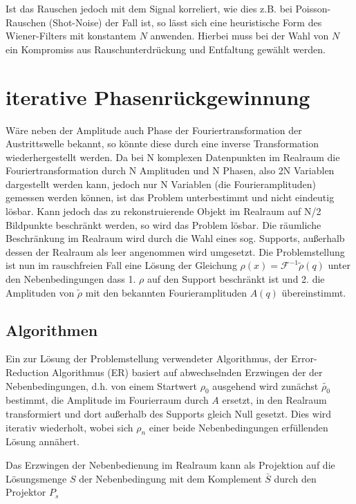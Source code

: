 Ist das Rauschen jedoch mit dem Signal korreliert, wie dies z.B. bei Poisson-Rauschen (Shot-Noise) der Fall ist, so lässt sich eine heuristische Form des Wiener-Filters mit konstantem $N$ anwenden. Hierbei muss bei der Wahl von $N$ ein Kompromiss aus Rauschunterdrückung und Entfaltung gewählt werden.

\section{iterative Phasenrückgewinnung}
Wäre neben der Amplitude auch Phase der Fouriertransformation der Austrittswelle bekannt, so könnte diese durch eine inverse Transformation wiederhergestellt werden. 
Da bei N komplexen Datenpunkten im Realraum die Fouriertransformation durch N Amplituden und N Phasen, also 2N Variablen dargestellt werden kann, jedoch nur N Variablen (die Fourieramplituden) gemessen werden können, ist das Problem unterbestimmt und nicht eindeutig lösbar. Kann jedoch das zu rekonstruierende Objekt im Realraum auf N/2 Bildpunkte beschränkt werden, so wird das Problem lösbar. Die räumliche Beschränkung im Realraum wird 
durch die Wahl eines sog. Supports, außerhalb dessen der Realraum als leer angenommen wird umgesetzt.  
Die Problemstellung ist nun im rauschfreien Fall eine Lösung der Gleichung $\rho(x)=\mathscr{F}^{-1}\tilde{\rho}(q)$ unter den Nebenbedingungen dass 1. $\rho$ auf den Support beschränkt ist und 2. die Amplituden von $\tilde{\rho}$ mit den bekannten Fourieramplituden $A(q)$ übereinstimmt.
\subsection{Algorithmen}
Ein zur Lösung der Problemstellung verwendeter Algorithmus, der Error-Reduction Algorithmus (ER) basiert auf abwechselnden Erzwingen der der Nebenbedingungen, d.h. von einem Startwert $\rho_0$ ausgehend wird zunächst $\tilde{\rho_0}$ bestimmt, die Amplitude im Fourierraum durch $A$ ersetzt, in den Realraum transformiert und dort außerhalb des Supports gleich Null gesetzt. Dies wird iterativ wiederholt, wobei sich $\rho_n$ einer beide Nebenbedingungen erfüllenden Lösung annähert.

Das Erzwingen der Nebenbedienung im Realraum kann als Projektion auf die Lösungsmenge $S$ der Nebenbedingung  mit dem Komplement $\bar{S}$ durch den Projektor $P_s$ 

